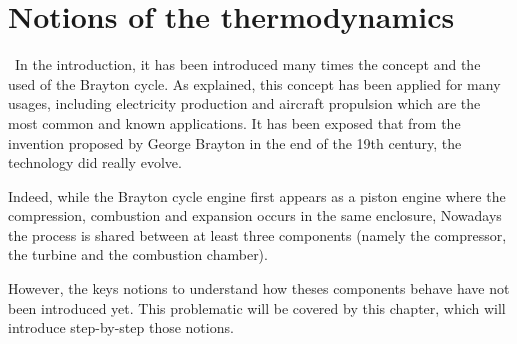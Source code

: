\graphicspath{{Chapter_2_-_Notions_of_thermodynamics/Images/}}
\chapter{Notions of the thermodynamics}\label{C2}
\quad\, In the introduction, it has been introduced many times the concept and the used of the Brayton cycle. As explained, this concept has been applied for many usages, including electricity production and aircraft propulsion which are the most common and known applications. It has been exposed that from the invention proposed by George Brayton in the end of the 19th century, the technology did really evolve.

Indeed, while the Brayton cycle engine first appears as a  piston engine where the compression, combustion and expansion occurs in the same enclosure, Nowadays 
the process is shared between at least three components (namely the compressor, the turbine and the combustion chamber).

However, the keys notions to understand how theses components behave have not been introduced yet. This problematic will be covered by this chapter, which will introduce step-by-step those notions.




%
%
